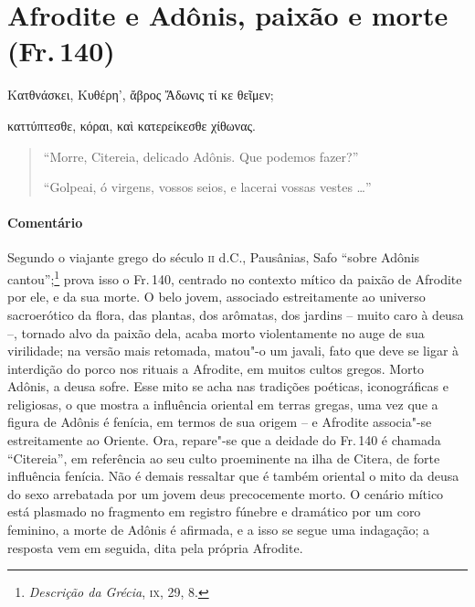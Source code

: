 \pagebreak
\section{Afrodite e Adônis, paixão e morte (Fr.\,140)}

\begin{gkverse}
Κατθνάσκει, Κυθέρη’, ἄβρος Ἄδωνις τί κε θεῖμεν;

καττύπτεσθε, κόραι, καὶ κατερείκεσθε χίθωνας.
\end{gkverse}

\begin{verse}
``Morre, Citereia, delicado Adônis. Que podemos fazer?''

``Golpeai, ó virgens, vossos seios, e lacerai vossas vestes \ldots{}''
\end{verse}

\medskip

\paragraph{Comentário} Segundo o viajante grego do século \textsc{ii} d.C., Pausânias, Safo ``sobre
Adônis cantou'';\footnote{\textit{Descrição da Grécia}, \textsc{ix}, 29, 8.} prova isso o Fr.\,140, 
centrado no contexto mítico da paixão de Afrodite por ele, e da sua morte.
O belo jovem, associado estreitamente ao universo sacroerótico da
flora, das plantas, dos arômatas, dos jardins -- muito caro à deusa --,
tornado alvo da paixão dela, acaba morto violentamente no auge de sua
virilidade; na versão mais retomada, matou"-o um javali, fato que deve se ligar
à interdição do porco nos rituais a Afrodite, em muitos cultos gregos. Morto
Adônis, a deusa sofre. Esse mito se acha nas tradições poéticas, iconográficas
e religiosas, o que mostra a influência oriental em terras gregas, uma vez que
a figura de Adônis é fenícia, em termos de sua origem -- e Afrodite associa"-se
estreitamente ao Oriente. Ora, repare"-se que a deidade do Fr.\,140 é chamada
``Citereia'', em referência ao seu culto proeminente na ilha de Citera,
de forte influência fenícia.
Não é demais ressaltar que é também oriental o
mito da deusa do sexo arrebatada por um jovem deus precocemente morto. O
cenário mítico está plasmado no fragmento em registro fúnebre e dramático por um coro feminino, a morte de Adônis é afirmada, e a isso
se segue uma indagação; a resposta vem em seguida, dita pela própria Afrodite.

